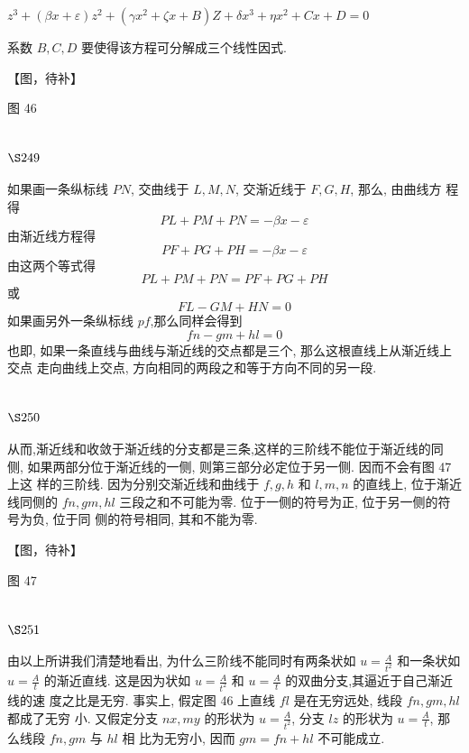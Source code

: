 $z^3+(\beta x+\varepsilon) z^2+\left(\gamma x^2+\zeta x+B\right) Z+\delta x^3+\eta x^2+C x+D=0$

系数 $B, C, D$ 要使得该方程可分解成三个线性因式.


【图，待补】

图 46

\section{$\S 249$}

如果画一条纵标线 $P N$, 交曲线于 $L, M, N$, 交渐近线于 $F, G, H$, 那么, 由曲线方 程得
\[
P L+P M+P N=-\beta x-\varepsilon
\]
由渐近线方程得
\[
P F+P G+P H=-\beta x-\varepsilon
\]
由这两个等式得
\[
P L+P M+P N=P F+P G+P H
\]
或
\[
F L-G M+H N=0
\]
如果画另外一条纵标线 $p f$,那么同样会得到
\[
f n-g m+h l=0
\]
也即, 如果一条直线与曲线与渐近线的交点都是三个, 那么这根直线上从渐近线上交点 走向曲线上交点, 方向相同的两段之和等于方向不同的另一段.

\section{$\S 250$}

从而,渐近线和收敛于渐近线的分支都是三条,这样的三阶线不能位于渐近线的同 侧, 如果两部分位于渐近线的一侧, 则第三部分必定位于另一侧. 因而不会有图 47 上这 样的三阶线. 因为分别交渐近线和曲线于 $f, g, h$ 和 $l, m, n$ 的直线上, 位于渐近线同侧的 $f n, g m, h l$ 三段之和不可能为零. 位于一侧的符号为正, 位于另一侧的符号为负, 位于同 侧的符号相同, 其和不能为零. 

【图，待补】

图 47

\section{$\S 251$}

由以上所讲我们清楚地看出, 为什么三阶线不能同时有两条状如 $u=\frac{A}{t^{2}}$ 和一条状如 $u=\frac{A}{t}$ 的渐近直线. 这是因为状如 $u=\frac{A}{t^{2}}$ 和 $u=\frac{A}{t}$ 的双曲分支,其逼近于自己渐近线的速 度之比是无穷. 事实上, 假定图 46 上直线 $f l$ 是在无穷远处, 线段 $f n, g m, h l$ 都成了无穷 小. 又假定分支 $n x, m y$ 的形状为 $u=\frac{A}{t^{2}}$, 分支 $l z$ 的形状为 $u=\frac{A}{t}$, 那么线段 $f n, g m$ 与 $h l$ 相 比为无穷小, 因而 $g m=f n+h l$ 不可能成立.

